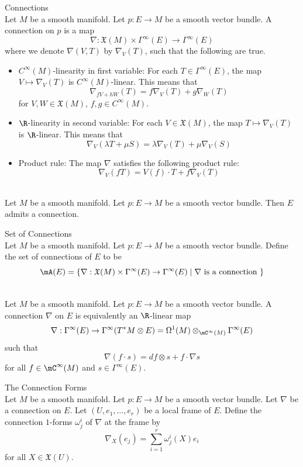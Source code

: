 \documentclass[a4paper]{article}
\begin{document}
\begin{defn}{Connections}{}\\
Let $M$ be a smooth manifold. Let $p:E\to M$ be a smooth vector bundle. A connection on $p$ is a map $$\nabla:\mathfrak{X}(M)\times\Gamma^\infty(E)\to\Gamma^\infty(E)$$ where we denote $\nabla(V,T)$ by $\nabla_V(T)$, such that the following are true. 
\begin{itemize}
\item $C^\infty(M)$-linearity in first variable: For each $T\in\Gamma^\infty(E)$, the map $V\mapsto\nabla_V(T)$ is $C^\infty(M)$-linear. This means that $$\nabla_{fV+hW}(T)=f\nabla_V(T)+g\nabla_W(T)$$ for $V,W\in\mathfrak{X}(M)$, $f,g\in C^\infty(M)$. 
\item $\R$-linearity in second variable: For each $V\in\mathfrak{X}(M)$, the map $T\mapsto\nabla_V(T)$ is $\R$-linear. This means that $$\nabla_V(\lambda T+\mu S)=\lambda\nabla_V(T)+\mu\nabla_V(S)$$
\item Product rule: The map $\nabla$ satisfies the following product rule: $$\nabla_V(fT)=V(f)\cdot T+f\nabla_V(T)$$
\end{itemize}
\end{defn}

\begin{prp}{}{}\\
Let $M$ be a smooth manifold. Let $p:E\to M$ be a smooth vector bundle. Then $E$ admits a connection. 
\end{prp}

\begin{defn}{Set of Connections}{}\\
Let $M$ be a smooth manifold. Let $p:E\to M$ be a smooth vector bundle. Define the set of connections of $E$ to be $$\mA(E)=\{\nabla:\mathfrak{X}(M)\times\Gamma^\infty(E)\to\Gamma^\infty(E)\;|\;\nabla\text{ is a connection }\}$$
\end{defn}

\begin{prp}{}{}\\
Let $M$ be a smooth manifold. Let $p:E\to M$ be a smooth vector bundle. A connection $\nabla$ on $E$ is equivalently an $\R$-linear map $$\nabla:\Gamma^\infty(E)\to\Gamma^\infty(T^\ast M\otimes E)=\Omega^1(M)\otimes_{\mC^\infty(M)}\Gamma^\infty(E)$$ such that $$\nabla(f\cdot s)=df\otimes s+f\cdot\nabla s$$ for all $f\in\mC^\infty(M)$ and $s\in\Gamma^\infty(E)$. 
\end{prp}

\begin{defn}{The Connection Forms}{}\\
Let $M$ be a smooth manifold. Let $p:E\to M$ be a smooth vector bundle. Let $\nabla$ be a connection on $E$. Let $(U,e_1,\dots,e_r)$ be a local frame of $E$. Define the connection $1$-forms $\omega_j^i$ of $\nabla$ at the frame by $$\nabla_X(e_j)=\sum_{i=1}^r\omega_j^i(X)e_i$$ for all $X\in\mathfrak{X}(U)$. 
\end{defn}
\end{document}
